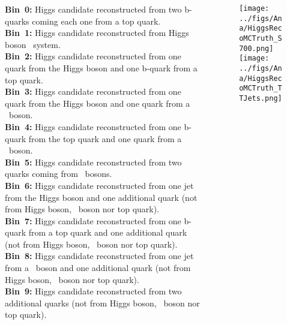 \begin{frame}{}
\vspace{-.2cm}
\scriptsize

\begin{columns}
\begin{column}{.50\textwidth}
\vspace{-.2cm}
\begin{block}{}
\tiny
\textbf{Bin~0:} Higgs candidate reconstructed from two b-quarks coming each one from a top quark.\\
\textbf{Bin~1:} Higgs candidate reconstructed from Higgs boson \bbbar~system.\\
\textbf{Bin~2:} Higgs candidate reconstructed from one quark from the Higgs boson and one b-quark from a top quark.\\
\textbf{Bin~3:} Higgs candidate reconstructed from one quark from the Higgs boson and one quark from a \W~boson.\\
\textbf{Bin~4:} Higgs candidate reconstructed from one b-quark from the top quark and one quark from a \W~boson.\\
\textbf{Bin~5:} Higgs candidate reconstructed from two quarks coming from \W~bosons.\\
\textbf{Bin~6:} Higgs candidate reconstructed from one jet from the Higgs boson and one additional quark (not from Higgs boson, \W~boson nor top quark).\\
\textbf{Bin~7:} Higgs candidate reconstructed from one b-quark from a top quark and one additional quark (not from Higgs boson, \W~boson nor top quark).\\
\textbf{Bin~8:} Higgs candidate reconstructed from one jet from a \W~boson and one additional quark (not from Higgs boson, \W~boson nor top quark).\\
\textbf{Bin~9:} Higgs candidate reconstructed from two additional quarks (not from Higgs boson, \W~boson nor top quark).
\end{block}
\end{column}

\begin{column}{.50\textwidth}
\begin{figure}[!Hhtbp]
  \begin{center}\vspace{-.3cm}
    \texttt{[image: ../figs/Ana/HiggsRecoMCTruth\_S700.png]}\\\vspace{-.3cm}
    \texttt{[image: ../figs/Ana/HiggsRecoMCTruth\_TTJets.png]}
  \end{center}
\end{figure}
\end{column}


\end{columns}
\end{frame}
